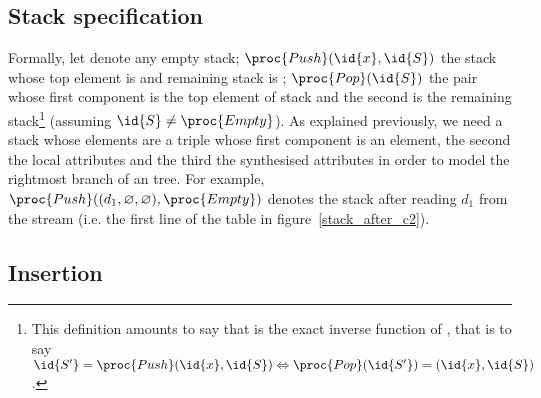 \subsection{Stack specification}

Formally, let  denote any empty stack; \(\proc{Push}
(\id{x}, \id{S})\) the stack whose top element is  and remaining
stack is ; \(\proc{Pop} (\id{S})\) the pair whose first
component is the top element of stack  and the second is the
remaining stack\footnote{This definition amounts to say that
   is the exact inverse function of , that is to
  say \(\id{S'} = \proc{Push} (\id{x}, \id{S}) \Leftrightarrow
  \proc{Pop}(\id{S'}) = (\id{x}, \id{S})\).} (assuming \(\id{S} \neq
\proc{Empty}\)). As explained previously, we need a stack whose
elements are a triple whose first component is an element, the second
the local attributes and the third the synthesised attributes in order
to model the rightmost branch of an \XML tree. For example,
\(\proc{Push} ((d_1, \varnothing, \varnothing),\proc{Empty})\) denotes
the stack after reading \(d_1\) from the stream (i.e. the first line
of the table in figure~\ref{stack_after_c2}).


\subsection{Insertion}

